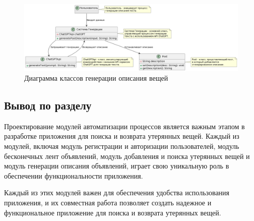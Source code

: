 \begin{figure}[htb]
	\centering
	\includegraphics[width=.95\textwidth]{images/generating-diagram.png}
	\parskip=6pt
	\caption{Диаграмма классов генерации описания вещей}
	\label{fig:generatingDiagram}
\end{figure}

\subsection*{Вывод по разделу}

Проектирование модулей автоматизации процессов является важным этапом в разработке приложения для поиска и возврата утерянных вещей. Каждый из модулей, включая модуль регистрации и авторизации пользователей, модуль бесконечных лент объявлений, модуль добавления и поиска утерянных вещей и модуль генерации описания объявлений, играет свою уникальную роль в обеспечении функциональности приложения.

Каждый из этих модулей важен для обеспечения удобства использования приложения, и их совместная работа позволяет создать надежное и функциональное приложение для поиска и возврата утерянных вещей.